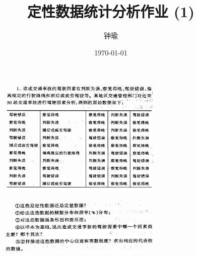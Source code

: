 \documentclass[11pt,a4paper]{ctexart}
\title{定性数据统计分析作业 (1)}
\author{钟瑜 \quad 222018314210044}
\date{\today}
\begin{document}
\maketitle
\pagestyle{plain}%
	
\begin{figure}[H]
	\centering
	\includegraphics[width=0.7\textwidth]{3.png}
\end{figure}
\begin{figure}[H]
	\centering
	\includegraphics[width=0.7\textwidth]{4.png}
\end{figure}
\end{document}
